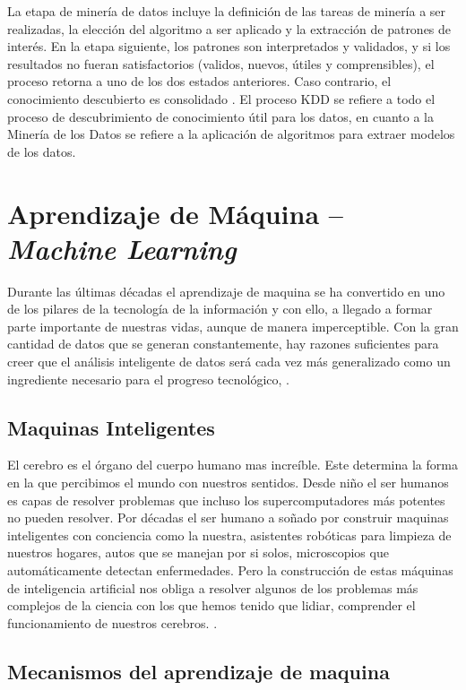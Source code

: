 La etapa de minería de datos incluye la definición de las tareas de minería a ser realizadas, la elección del algoritmo a ser aplicado y la extracción de patrones de interés. En la etapa siguiente, los patrones son interpretados y validados, y si los resultados no fueran satisfactorios (validos, nuevos, útiles y comprensibles), el proceso retorna a uno de los dos estados anteriores. Caso contrario, el conocimiento descubierto es consolidado \cite{Fayyad:1996:DMK:257938.257942}. El proceso KDD se refiere a todo el proceso de descubrimiento de conocimiento útil para los datos, en cuanto a la Minería de los Datos se refiere a la aplicación de algoritmos para extraer modelos de los datos.


\section{Aprendizaje de Máquina -- \textit{Machine Learning} }\label{sec:machine-learning}

    Durante las últimas décadas el aprendizaje de maquina se ha convertido en uno de los pilares de la tecnología de la información y con ello, a llegado a formar parte importante de nuestras vidas, aunque de manera imperceptible. Con la gran cantidad de datos que se generan constantemente, hay razones suficientes para creer que el análisis inteligente de datos será cada vez más generalizado como un ingrediente necesario para el progreso tecnológico, \cite{smola2008ml}.

    \subsection*{Maquinas Inteligentes}

    El cerebro es el órgano del cuerpo humano mas increíble. Este determina la forma en la que percibimos el mundo con nuestros sentidos. Desde niño el ser humanos es capas de  resolver problemas que incluso los supercomputadores más potentes no pueden resolver. Por décadas el ser humano a soñado por construir maquinas inteligentes con conciencia como la nuestra, asistentes robóticas para limpieza de nuestros hogares, autos que se manejan por si solos, microscopios que automáticamente detectan enfermedades. Pero la construcción de estas máquinas de inteligencia artificial nos obliga a resolver algunos de los problemas más complejos de la ciencia con los que hemos tenido que lidiar, comprender el funcionamiento de nuestros cerebros. \cite{dlBook}.

    \subsection*{Mecanismos del aprendizaje de maquina}

